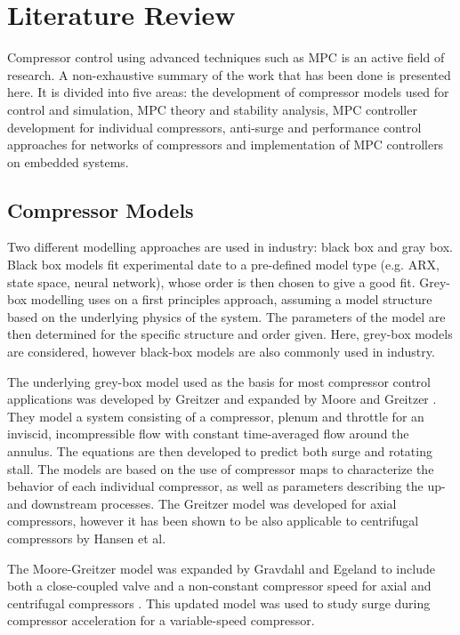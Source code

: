 \chapter{Literature Review}
Compressor control using advanced techniques such as MPC is an active field of research. 
A non-exhaustive summary of the work that has been done is presented here.
It is divided into five areas: the development of compressor models used for control and simulation, MPC theory and stability analysis, MPC controller development for individual compressors, anti-surge and performance control approaches for networks of compressors and implementation of MPC controllers on embedded systems. 

\section{Compressor Models}

Two different modelling approaches are used in industry: black box and gray box. Black box models fit experimental date to a pre-defined model type (e.g. ARX, state space, neural network), whose order is then chosen to give a good fit. 
Grey-box modelling uses on a first principles approach, assuming a model structure based on the underlying physics of the system. 
The parameters of the model are then determined for the specific structure and order given. 
Here, grey-box models are considered, however black-box models are also commonly used in industry.

The underlying grey-box model used as the basis for most compressor control applications was developed by Greitzer \cite{Greitzer1976} and expanded by Moore and Greitzer \cite{Moore1985}.
They model a system consisting of a compressor, plenum and throttle for an inviscid, incompressible flow with constant time-averaged flow around the annulus. 
The equations are then developed to predict both surge and rotating stall.
The models are based on the use of compressor maps to characterize the behavior of each individual compressor, as well as parameters describing the up- and downstream processes.
The Greitzer model was developed for axial compressors, however it has been shown to be also applicable to centrifugal compressors by Hansen et al. \cite{Hansen1981} 

The Moore-Greitzer model was expanded by Gravdahl and Egeland to include both a close-coupled valve and a non-constant compressor speed for axial and centrifugal compressors \cite{Gravdahl1999}. 
This updated model was used to study surge during compressor acceleration for a variable-speed compressor.

